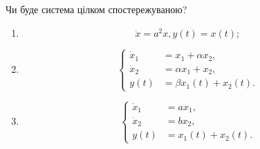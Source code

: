 \begin{problem}
    Чи буде система цілком спостережуваною?

    \begin{enumerate}
    	\item \[ \ddot x = a^2 x, y(t) = x(t); \]

    	\item \[ \left \{ \begin{aligned}
    		\dot x_1 &= x_1 + \alpha x_2, \\
    		\dot x_2 &= \alpha x_1 + x_2, \\
    		y(t) &= \beta x_1 (t) + x_2 (t).
    	\end{aligned} \right. \]

    	\item \[ \left \{ \begin{aligned}
    		\dot x_1 &= a x_1, \\
    		\dot x_2 &= b x_2, \\
    		y(t) &= x_1 (t) + x_2 (t).
    	\end{aligned} \right. \]
    \end{enumerate}
\end{problem}

